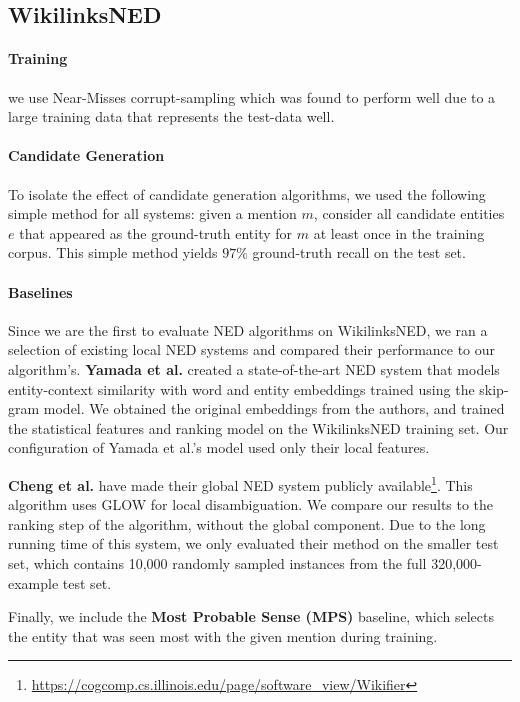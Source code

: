 \documentclass[11pt]{article}
\begin{document}
\subsection{WikilinksNED}

\paragraph{Training} we use Near-Misses corrupt-sampling which was found to perform well due to a large training data that represents the test-data well.

\paragraph{Candidate Generation}
To isolate the effect of candidate generation algorithms, we used the following simple method for all systems: given a mention $m$, consider all candidate entities $e$ that appeared as the ground-truth entity for $m$ at least once in the training corpus. This simple method yields $97\%$ ground-truth recall on the test set.

\paragraph{Baselines}
Since we are the first to evaluate NED algorithms on WikilinksNED, we ran a selection of existing local NED systems and compared their performance to our algorithm's. \textbf{Yamada et al.}  created a state-of-the-art NED system that models entity-context similarity with word and entity embeddings trained using the skip-gram model. We obtained the original embeddings from the authors, and trained the statistical features and ranking model on the WikilinksNED training set. Our configuration of Yamada et al.'s model used only their local features.

\textbf{Cheng et al.}  have made their global NED system publicly available\footnote{\url{https://cogcomp.cs.illinois.edu/page/software\_view/Wikifier}}. This algorithm uses GLOW \cite{Ratinov2011} for local disambiguation. We compare our results to the ranking step of the algorithm, without the global component. Due to the long running time of this system, we only evaluated their method on the smaller test set, which contains 10,000 randomly sampled instances from the full 320,000-example test set.

Finally, we include the \textbf{Most Probable Sense (MPS)} baseline, which selects the entity that was seen most with the given mention during training.
\end{document}
